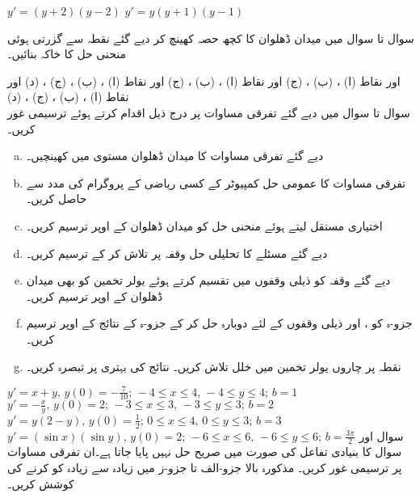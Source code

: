 $y'=(y+2)(y-2)$
$y'=y(y+1)(y-1)$

سوال  تا سوال  میں میدان ڈھلوان کا کچھ حصہ کھینچ کر دیے گئے نقطہ سے گزرتی ہوئی منحنی حل کا خاکہ بنائیں۔
 
 اور نقاط (ا) ، (ب) ، (ج) 
 اور نقاط (ا) ، (ب) ، (ج) 
 اور نقاط (ا) ، (ب) ، (ج) ، (د) 
 اور نقاط (ا) ، (ب) ، (ج) ، (د) 
\\
سوال  تا سوال  میں دیے گئے تفرقی مساوات پر درج ذیل اقدام کرتے ہوئے ترسیمی غور کریں۔
\begin{enumerate}[a.]
\item
دیے گئے تفرقی مساوات کا میدان ڈھلوان  مستوی میں کھینچیں۔
\item
تفرقی مساوات کا عمومی حل کمپیوٹر کے کسی ریاضی کے پروگرام کی مدد سے حاصل کریں۔
\item
اختیاری مستقل  لیتے ہوئے منحنی حل کو میدان ڈھلوان کے اوپر ترسیم کریں۔
\item
دیے گئے مسئلے کا تحلیلی حل وقفہ  پر تلاش کر کے ترسیم کریں۔
\item
 دیے گئے وقفہ کو  ذیلی وقفوں میں تقسیم کرتے ہوئے یولر تخمین کو بھی میدان ڈھلوان کے اوپر ترسیم کریں۔
\item
 جزو-ہ کو ،  اور  ذیلی وقفوں کے لئے دوبارہ حل کر کے جزو-ہ کے نتائج کے اوپر ترسیم کریں۔
\item
نقطہ  پر چاروں یولر تخمین میں خلل تلاش کریں۔ نتائج کی بہتری پر تبصرہ کریں۔
\end{enumerate}

$y'=x+y,\, y(0)=-\tfrac{7}{10};\, -4\le x\le 4,\, -4\le y\le 4;\, b=1$
$y'=-\tfrac{x}{y},\, y(0)=2;\, -3\le x\le 3,\, -3\le y\le 3;\, b=2$
$y'=y(2-y),\, y(0)=\tfrac{1}{2};\, 0\le x\le 4,\, 0\le y\le 3;\, b=3$
$y'=(\sin x)(\sin y),\, y(0)=2;\, -6\le x\le 6,\, -6\le y\le 6;\, b=\tfrac{3\pi}{2}$
سوال   اور سوال  کا بنیادی تفاعل کی صورت میں صریح حل نہیں پایا جاتا ہے۔ان تفرقی مساوات پر ترسیمی غور کریں۔ مذکورہ بالا جزو-الف تا جزو-ز میں زیادہ سے زیادہ کو کرنے کی کوشش کریں۔
 

